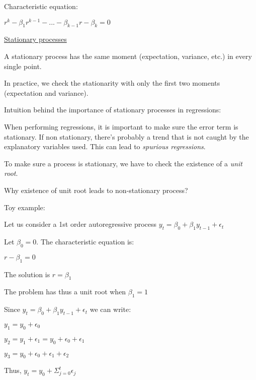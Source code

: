 \vspace{5mm}

Characteristic equation:

$r^k - \beta_1 r^{k-1} - ... - \beta_{k-1} r - \beta_k = 0$

\vspace{5mm}

\underline{Stationary processes}

\vspace{5mm}

A stationary process has the same moment (expectation, variance, etc.)  in every single point.

In practice, we check the stationarity with only the first two moments (expectation and variance).

\vspace{5mm}

Intuition behind the importance of stationary processes in regressions:

When performing regressions, it is important to make sure the error term is stationary. If non stationary, there's probably a trend that is not caught by the explanatory variables used. This can lead to \textit{spurious regressions}.

\vspace{5mm}

To make sure a process is stationary, we have to check the existence of a \textit{unit root}.

\vspace{5mm}

Why existence of unit root leads to non-stationary process?

Toy example:

Let us consider a 1st order autoregressive process $y_t = \beta_0 + \beta_1 y_{t-1} + \epsilon_t$

Let $\beta_0 = 0$. The characteristic equation is:

$r - \beta_1 = 0$

The solution is $r = \beta_1$

The problem has thus a unit root when $\beta_1 = 1$

Since $y_t = \beta_0 + \beta_1 y_{t-1} + \epsilon_t$ we can write:

$y_1 = y_0 + \epsilon_0$

$y_2 = y_1 + \epsilon_1 = y_0 + \epsilon_0 + \epsilon_1$

$y_3 = y_0 + \epsilon_0 + \epsilon_1 + \epsilon_2$

Thus, $y_t = y_0 + \Sigma_{j=0}^t \epsilon_j$

